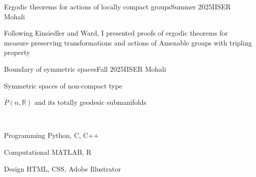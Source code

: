 \documentclass{LoLaTeXcv}
\begin{document}
\begin{lltxJob}{Ergodic theorems for actions of locally compact groups}{Summer 2025}{IISER Mohali}
	\item Following Einsiedler and Ward, I presented proofs of ergodic theorems for measure preserving transformations and actions of Amenable groups with tripling property
\end{lltxJob}


\begin{lltxJob}{Boundary of symmetric spaces}{Fall 2025}{IISER Mohali}
	\item Symmetric spaces of non-compact type
	\item $P(n,\mathbb{R})$ and its totally geodesic submanifolds
\end{lltxJob}



\

\begin{lltxDescription}
	\item[Programming] Python, C, C++
	\item[Computational] MATLAB, R
	\item[Design] HTML, CSS, Adobe Illustrator
\end{lltxDescription}



\end{document}
